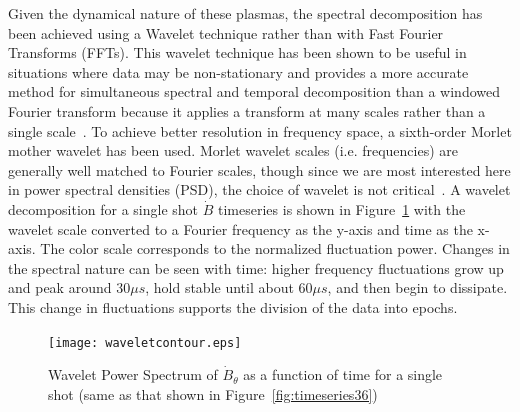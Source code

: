\documentclass[12pt]{iopart}
\begin{document}
Given the dynamical nature of these plasmas, the spectral decomposition has been achieved using a Wavelet technique rather than with Fast Fourier Transforms (FFTs). This wavelet technique has been shown to be useful in situations where data may be non-stationary and provides a more accurate method for simultaneous spectral and temporal decomposition than a windowed Fourier transform because it applies a transform at many scales rather than a single scale~\cite{torrence98}. To achieve better resolution in frequency space, a sixth-order Morlet mother wavelet has been used. Morlet wavelet scales (i.e. frequencies) are generally well matched to Fourier scales, though since we are most interested here in power spectral densities (PSD), the choice of wavelet is not critical~\cite{torrence98}. A wavelet decomposition for a single shot $\dot{B}$ timeseries is shown in Figure~\ref{fig:waveletcontour} with the wavelet scale converted to a Fourier frequency as the y-axis and time as the x-axis. The color scale corresponds to the normalized fluctuation power. Changes in the spectral nature can be seen with time: higher frequency fluctuations grow up and peak around 30$\mu s$, hold stable until about 60$\mu s$, and then begin to dissipate. This change in fluctuations supports the division of the data into epochs.

\begin{figure}[!htbp]
\centerline{
\texttt{[image: waveletcontour.eps]}}
\caption{\label{fig:waveletcontour} Wavelet Power Spectrum of $\dot{B}_{\theta}$ as a function of time for a single shot (same as that shown in Figure~\ref{fig:timeseries36})}
\end{figure}
\end{document}
